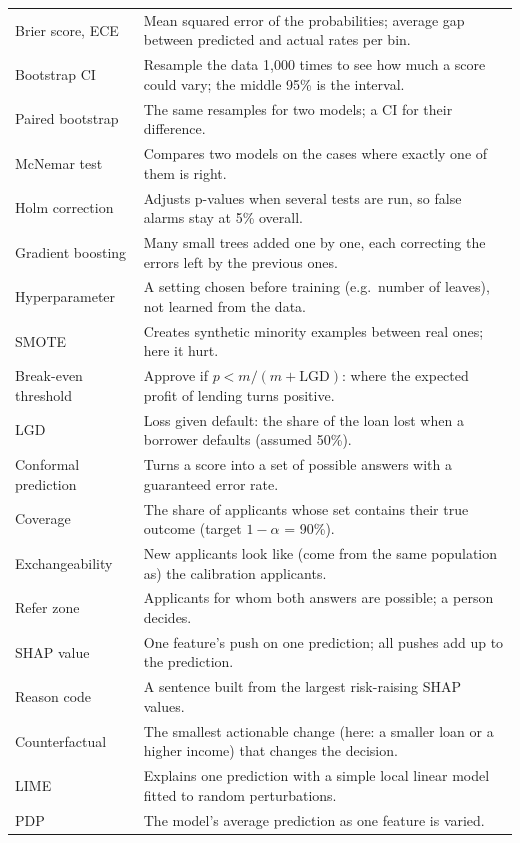 \documentclass[conference,10pt]{IEEEtran}
\begin{document}
\begin{table}[!ht]
\begin{tabular}{@{}lp{13.2cm}@{}}
Brier score, ECE & Mean squared error of the probabilities; average gap between predicted and actual rates per bin. \\
Bootstrap CI & Resample the data 1,000 times to see how much a score could vary; the middle 95\% is the interval. \\
Paired bootstrap & The same resamples for two models; a CI for their difference. \\
McNemar test & Compares two models on the cases where exactly one of them is right. \\
Holm correction & Adjusts p-values when several tests are run, so false alarms stay at 5\% overall. \\
Gradient boosting & Many small trees added one by one, each correcting the errors left by the previous ones. \\
Hyperparameter & A setting chosen before training (e.g.\ number of leaves), not learned from the data. \\
SMOTE & Creates synthetic minority examples between real ones; here it hurt. \\
Break-even threshold & Approve if $p < m/(m+\mathrm{LGD})$: where the expected profit of lending turns positive. \\
LGD & Loss given default: the share of the loan lost when a borrower defaults (assumed 50\%). \\
Conformal prediction & Turns a score into a set of possible answers with a guaranteed error rate. \\
Coverage & The share of applicants whose set contains their true outcome (target $1-\alpha$ = 90\%). \\
Exchangeability & New applicants look like (come from the same population as) the calibration applicants. \\
Refer zone & Applicants for whom both answers are possible; a person decides. \\
SHAP value & One feature's push on one prediction; all pushes add up to the prediction. \\
Reason code & A sentence built from the largest risk-raising SHAP values. \\
Counterfactual & The smallest actionable change (here: a smaller loan or a higher income) that changes the decision. \\
LIME & Explains one prediction with a simple local linear model fitted to random perturbations. \\
PDP & The model's average prediction as one feature is varied. \\

\end{tabular}
\end{table}
\end{document}
